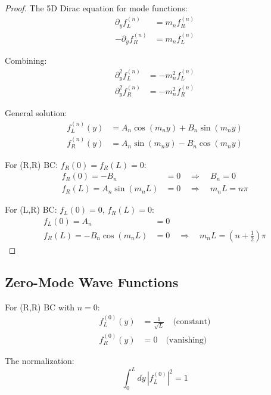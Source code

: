 \documentclass[11pt,a4paper]{article}
\begin{document}
\begin{proof}
The 5D Dirac equation for mode functions:
\begin{align}
\label{eq:mode-eq-L}
\partial_y f_L^{(n)} &= m_n f_R^{(n)} \\
\label{eq:mode-eq-R}
-\partial_y f_R^{(n)} &= m_n f_L^{(n)}
\end{align}

Combining:
\begin{align}
\label{eq:second-order-L}
\partial_y^2 f_L^{(n)} &= -m_n^2 f_L^{(n)} \\
\label{eq:second-order-R}
\partial_y^2 f_R^{(n)} &= -m_n^2 f_R^{(n)}
\end{align}

General solution:
\begin{align}
\label{eq:gen-sol-L}
f_L^{(n)}(y) &= A_n \cos(m_n y) + B_n \sin(m_n y) \\
\label{eq:gen-sol-R}
f_R^{(n)}(y) &= A_n \sin(m_n y) - B_n \cos(m_n y)
\end{align}

For (R,R) BC: $f_R(0) = f_R(L) = 0$:
\begin{align}
\label{eq:bc-RR-0}
f_R(0) = -B_n &= 0 \quad \Rightarrow \quad B_n = 0 \\
\label{eq:bc-RR-L}
f_R(L) = A_n \sin(m_n L) &= 0 \quad \Rightarrow \quad m_n L = n\pi
\end{align}

For (L,R) BC: $f_L(0) = 0$, $f_R(L) = 0$:
\begin{align}
\label{eq:bc-LR-0}
f_L(0) = A_n &= 0 \\
\label{eq:bc-LR-L}
f_R(L) = -B_n \cos(m_n L) &= 0 \quad \Rightarrow \quad m_n L = (n + \tfrac{1}{2})\pi
\end{align}
\end{proof}

\subsection{Zero-Mode Wave Functions}

For (R,R) BC with $n = 0$:
\begin{align}
\label{eq:zero-mode-fL}
f_L^{(0)}(y) &= \frac{1}{\sqrt{L}} \quad \text{(constant)} \\
\label{eq:zero-mode-fR}
f_R^{(0)}(y) &= 0 \quad \text{(vanishing)}
\end{align}

The normalization:
\begin{equation}
\label{eq:norm-zero}
\int_0^L dy\, |f_L^{(0)}|^2 = 1
\end{equation}
\end{document}
